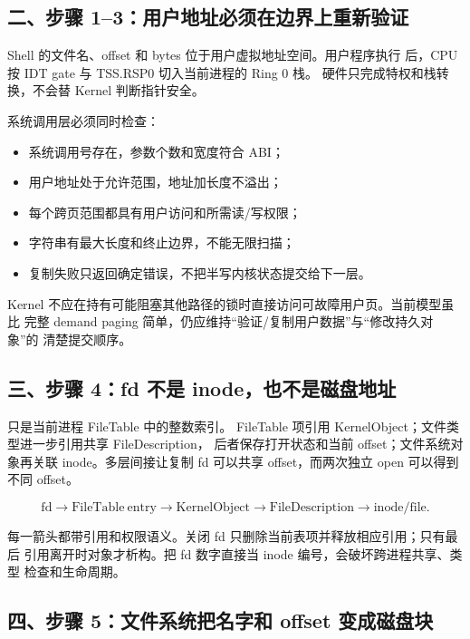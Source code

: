 \subsection{二、步骤 1--3：用户地址必须在边界上重新验证}

Shell 的文件名、offset 和 bytes 位于用户虚拟地址空间。用户程序执行
 后，CPU 按 IDT gate 与 TSS.RSP0 切入当前进程的 Ring 0 栈。
硬件只完成特权和栈转换，不会替 Kernel 判断指针安全。

系统调用层必须同时检查：

\begin{itemize}[leftmargin=2em]
  \item 系统调用号存在，参数个数和宽度符合 ABI；
  \item 用户地址处于允许范围，地址加长度不溢出；
  \item 每个跨页范围都具有用户访问和所需读/写权限；
  \item 字符串有最大长度和终止边界，不能无限扫描；
  \item 复制失败只返回确定错误，不把半写内核状态提交给下一层。
\end{itemize}

Kernel 不应在持有可能阻塞其他路径的锁时直接访问可故障用户页。当前模型虽比
完整 demand paging 简单，仍应维持“验证/复制用户数据”与“修改持久对象”的
清楚提交顺序。

\subsection{三、步骤 4：fd 不是 inode，也不是磁盘地址}

只是当前进程 FileTable 中的整数索引。
FileTable 项引用 KernelObject；文件类型进一步引用共享 FileDescription，
后者保存打开状态和当前 offset；文件系统对象再关联 inode。多层间接让复制 fd
可以共享 offset，而两次独立 open 可以得到不同 offset。

\[
\mathrm{fd}
\rightarrow \mathrm{FileTable\ entry}
\rightarrow \mathrm{KernelObject}
\rightarrow \mathrm{FileDescription}
\rightarrow \mathrm{inode/file}.
\]

每一箭头都带引用和权限语义。关闭 fd 只删除当前表项并释放相应引用；只有最后
引用离开时对象才析构。把 fd 数字直接当 inode 编号，会破坏跨进程共享、类型
检查和生命周期。

\subsection{四、步骤 5：文件系统把名字和 offset 变成磁盘块}

